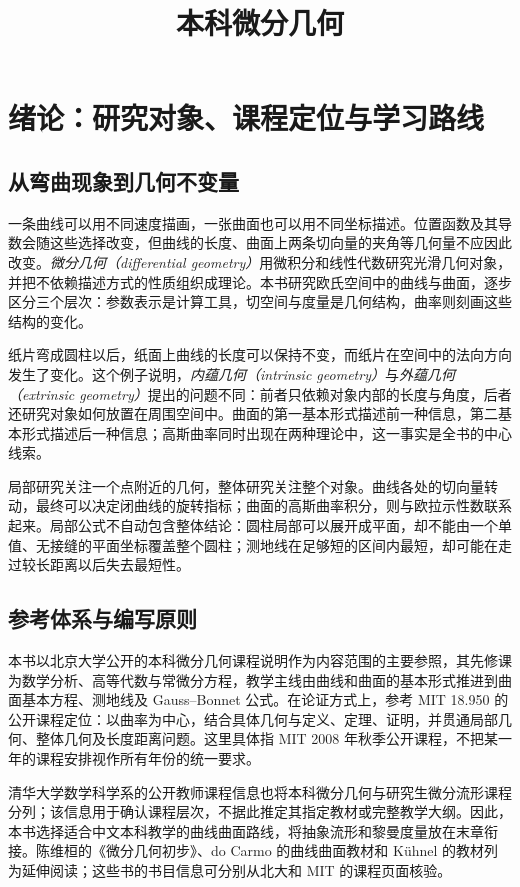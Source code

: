 \documentclass[UTF8,12pt,a4paper,fontset=fandol]{ctexbook}
\title{本科微分几何}
\author{}
\date{}
\begin{document}
\frontmatter
\maketitle
\tableofcontents

\chapter{绪论：研究对象、课程定位与学习路线}
\label{chap:dg-intro}

\section{从弯曲现象到几何不变量}
一条曲线可以用不同速度描画，一张曲面也可以用不同坐标描述。位置函数及其导数会随这些选择改变，但曲线的长度、曲面上两条切向量的夹角等几何量不应因此改变。\emph{微分几何（differential geometry）}用微积分和线性代数研究光滑几何对象，并把不依赖描述方式的性质组织成理论。本书研究欧氏空间中的曲线与曲面，逐步区分三个层次：参数表示是计算工具，切空间与度量是几何结构，曲率则刻画这些结构的变化。

纸片弯成圆柱以后，纸面上曲线的长度可以保持不变，而纸片在空间中的法向方向发生了变化。这个例子说明，\emph{内蕴几何（intrinsic geometry）}与\emph{外蕴几何（extrinsic geometry）}提出的问题不同：前者只依赖对象内部的长度与角度，后者还研究对象如何放置在周围空间中。曲面的第一基本形式描述前一种信息，第二基本形式描述后一种信息；高斯曲率同时出现在两种理论中，这一事实是全书的中心线索。

局部研究关注一个点附近的几何，整体研究关注整个对象。曲线各处的切向量转动，最终可以决定闭曲线的旋转指标；曲面的高斯曲率积分，则与欧拉示性数联系起来。局部公式不自动包含整体结论：圆柱局部可以展开成平面，却不能由一个单值、无接缝的平面坐标覆盖整个圆柱；测地线在足够短的区间内最短，却可能在走过较长距离以后失去最短性。

\section{参考体系与编写原则}
本书以北京大学公开的本科微分几何课程说明作为内容范围的主要参照，其先修课为数学分析、高等代数与常微分方程，教学主线由曲线和曲面的基本形式推进到曲面基本方程、测地线及 Gauss--Bonnet 公式\cite{pku-course}。在论证方式上，参考 MIT 18.950 的公开课程定位：以曲率为中心，结合具体几何与定义、定理、证明，并贯通局部几何、整体几何及长度距离问题\cite{mit-syllabus,mit-notes}。这里具体指 MIT 2008 年秋季公开课程，不把某一年的课程安排视作所有年份的统一要求。

清华大学数学科学系的公开教师课程信息也将本科微分几何与研究生微分流形课程分列\cite{tsinghua-course}；该信息用于确认课程层次，不据此推定其指定教材或完整教学大纲。因此，本书选择适合中文本科教学的曲线曲面路线，将抽象流形和黎曼度量放在末章衔接。陈维桓的《微分几何初步》、do Carmo 的曲线曲面教材和 K\"uhnel 的教材列为延伸阅读；这些书的书目信息可分别从北大和 MIT 的课程页面核验\cite{chen,docarmo,kuhnel}。
\end{document}
